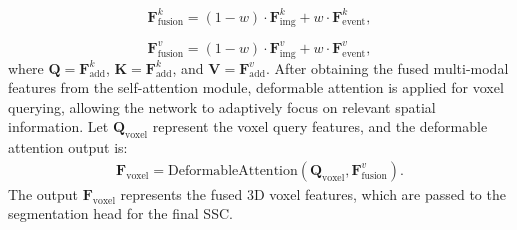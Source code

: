 \begin{equation}
   \mathbf{F}^{k}_{\text{fusion}} = (1-w) \cdot \mathbf{F}^{k}_{\text{img}} + w \cdot \mathbf{F}^{k}_{\text{event}},
\end{equation}

\begin{equation}
   \mathbf{F}^{v}_{\text{fusion}} = (1-w) \cdot \mathbf{F}^{v}_{\text{img}} + w \cdot \mathbf{F}^{v}_{\text{event}},
\end{equation}
where \( \mathbf{Q} {=} \mathbf{F}^{k}_{\text{add}} \), \( \mathbf{K} {=} \mathbf{F}^{k}_{\text{add}} \), and \( \mathbf{V} {=} \mathbf{F}^{v}_{\text{add}} \).
After obtaining the fused multi-modal features from the self-attention module, deformable attention is applied for voxel querying, allowing the network to adaptively focus on relevant spatial information. Let \( \mathbf{Q}_{\text{voxel}} \) represent the voxel query features, and the deformable attention output is:
\begin{align}
   \mathbf{F}_{\text{voxel}} = \text{DeformableAttention}(\mathbf{Q}_{\text{voxel}}, \mathbf{F}^{v}_{\text{fusion}}).
\end{align}
The output \( \mathbf{F}_{\text{voxel}} \) represents the fused 3D voxel features, which are passed to the segmentation head for the final SSC.


%








